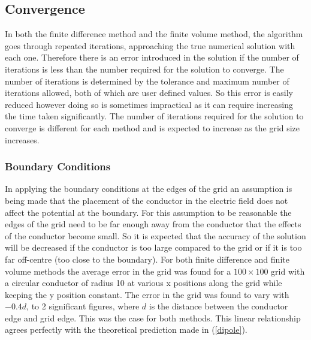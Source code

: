 \documentclass[aps,twocolumn,pre,nofootinbib,10pt]{revtex4-1}
\begin{document}
\subsection{Convergence}

In both the finite difference method and the finite volume method, the algorithm goes through repeated iterations, approaching the true numerical solution with each one. Therefore there is an error introduced in the solution if the number of iterations is less than the number required for the solution to converge. The number of iterations is determined by the tolerance and maximum number of iterations allowed, both of which are user defined values. So this error is easily reduced however doing so is sometimes impractical as it can require increasing the time taken significantly. The number of iterations required for the solution to converge is different for each method and is expected to increase as the grid size increases.



\subsubsection{Boundary Conditions}

In applying the boundary conditions at the edges of the grid an assumption is being made that the placement of the conductor in the electric field does not affect the potential at the boundary. For this assumption to be reasonable the edges of the grid need to be far enough away from the conductor that the effects of the conductor become small. So it is expected that the accuracy of the solution will be decreased if the conductor is too large compared to the grid or if it is too far off-centre (too close to the boundary). For both finite difference and finite volume methods the average error in the grid was found for a $100 \times 100$ grid with a circular conductor of radius 10 at various x positions along the grid while keeping the y position constant. The error in the grid was found to vary with \(-0.4d\), to 2 significant figures, where $d$ is the distance between the conductor edge and grid edge. This was the case for both methods. This linear relationship agrees perfectly with the theoretical 
prediction made in (\ref{dipole}).
\end{document}

